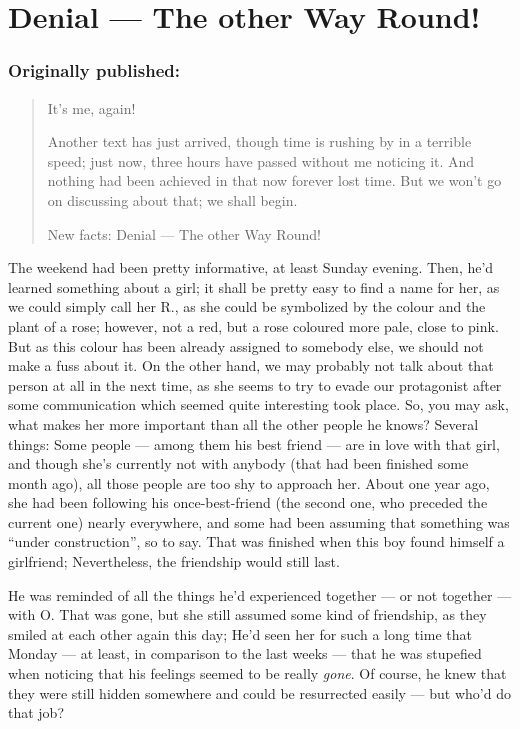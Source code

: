 \chapter{Denial --- The other Way Round!}
\label{cha:denial-the-other-way-round}
\subsection*{Originally published: }
\begin{quote}
It's me, again!

Another text has just arrived, though time is rushing by in a terrible speed; just now, three hours have passed without me noticing it. And nothing had been achieved in that now forever lost time. But we won't go on discussing about that; we shall begin.

New facts: Denial --- The other Way Round!
\end{quote}

The weekend had been pretty informative, at least Sunday evening. Then, he'd learned something about a girl; it shall be pretty easy to find a name for her, as we could simply call her R., as she could be symbolized by the colour and the plant of a rose; however, not a red, but a rose coloured more pale, close to pink. But as this colour has been already assigned to somebody else, we should not make a fuss about it. On the other hand, we may probably not talk about that person at all in the next time, as she seems to try to evade our protagonist after some communication which seemed quite interesting took place. So, you may ask, what makes her more important than all the other people he knows? Several things: Some people --- among them his best friend --- are in love with that girl, and though she's currently not with anybody (that had been finished some month ago), all those people are too shy to approach her. About one year ago, she had been following his once-best-friend (the second one, who preceded the current one) nearly everywhere, and some had been assuming that something was \enquote{under construction}, so to say. That was finished when this boy found himself a girlfriend; Nevertheless, the friendship would still last.

He was reminded of all the things he'd experienced together --- or not together --- with O. That was gone, but she still assumed some kind of friendship, as they smiled at each other again this day; He'd seen her for such a long time that Monday --- at least, in comparison to the last weeks --- that he was stupefied when noticing that his feelings seemed to be really \emph{gone}. Of course, he knew that they were still hidden somewhere and could be resurrected easily --- but who'd do that job?


